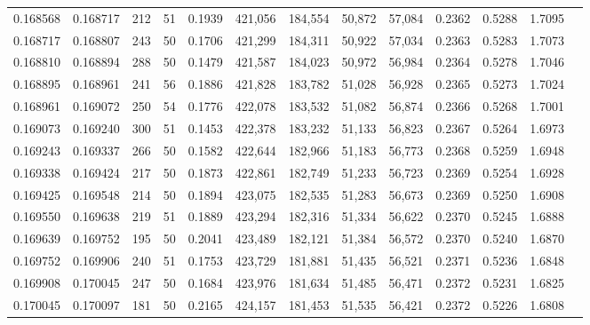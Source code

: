\begin{tabular}{rrrrrrrrrrrrr}
0.168568 & 0.168717 &   212 &  51 &                                     0.1939 & 421,056 & 184,554 &  50,872 &  57,084 & 0.2362 & 0.5288 & 1.7095 \\
0.168717 & 0.168807 &   243 &  50 &                                     0.1706 & 421,299 & 184,311 &  50,922 &  57,034 & 0.2363 & 0.5283 & 1.7073 \\
0.168810 & 0.168894 &   288 &  50 &                                     0.1479 & 421,587 & 184,023 &  50,972 &  56,984 & 0.2364 & 0.5278 & 1.7046 \\
0.168895 & 0.168961 &   241 &  56 &                                     0.1886 & 421,828 & 183,782 &  51,028 &  56,928 & 0.2365 & 0.5273 & 1.7024 \\
0.168961 & 0.169072 &   250 &  54 &                                     0.1776 & 422,078 & 183,532 &  51,082 &  56,874 & 0.2366 & 0.5268 & 1.7001 \\
0.169073 & 0.169240 &   300 &  51 &                                     0.1453 & 422,378 & 183,232 &  51,133 &  56,823 & 0.2367 & 0.5264 & 1.6973 \\
0.169243 & 0.169337 &   266 &  50 &                                     0.1582 & 422,644 & 182,966 &  51,183 &  56,773 & 0.2368 & 0.5259 & 1.6948 \\
0.169338 & 0.169424 &   217 &  50 &                                     0.1873 & 422,861 & 182,749 &  51,233 &  56,723 & 0.2369 & 0.5254 & 1.6928 \\
0.169425 & 0.169548 &   214 &  50 &                                     0.1894 & 423,075 & 182,535 &  51,283 &  56,673 & 0.2369 & 0.5250 & 1.6908 \\
0.169550 & 0.169638 &   219 &  51 &                                     0.1889 & 423,294 & 182,316 &  51,334 &  56,622 & 0.2370 & 0.5245 & 1.6888 \\
0.169639 & 0.169752 &   195 &  50 &                                     0.2041 & 423,489 & 182,121 &  51,384 &  56,572 & 0.2370 & 0.5240 & 1.6870 \\
0.169752 & 0.169906 &   240 &  51 &                                     0.1753 & 423,729 & 181,881 &  51,435 &  56,521 & 0.2371 & 0.5236 & 1.6848 \\
0.169908 & 0.170045 &   247 &  50 &                                     0.1684 & 423,976 & 181,634 &  51,485 &  56,471 & 0.2372 & 0.5231 & 1.6825 \\
0.170045 & 0.170097 &   181 &  50 &                                     0.2165 & 424,157 & 181,453 &  51,535 &  56,421 & 0.2372 & 0.5226 & 1.6808 \\

\end{tabular}
